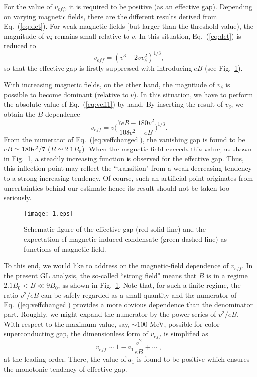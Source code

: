 \documentclass[12pt]{article}
\begin{document}
For the value of $v_{eff}$, it is required to be positive (as an effective gap).
Depending on varying magnetic fields, there are the different results derived from Eq.~(\ref{eq:det}).
For weak magnetic fields (but larger than the threshold value), the magnitude of $v_\delta$ remains
small relative to $v$. In this situation, Eq.~(\ref{eq:det}) is reduced to
\begin{equation}
\label{eq:veff1}
v_{eff} =  (v^3-2 vv_\delta^2)^{1/3},
\end{equation}
so that the effective gap is firstly suppressed with introducing $eB$ (see Fig.~\ref{fig:1}).

With increasing magnetic fields, on the other hand, the magnitude of $v_\delta$ is possible to
become dominant (relative to $v$). In this situation, we have to perform the absolute value of
Eq.~(\ref{eq:veff1}) by hand. By inserting the result of $v_\delta$, we obtain the $B$ dependence
\begin{equation}
\label{eq:veffchanged}
v_{eff} = v \Big(\frac{7eB-180v^2}{108v^2-eB}\Big)^{1/3}.
\end{equation}
From the numerator of Eq.~(\ref{eq:veffchanged}), the vanishing gap is found to be $eB\simeq 180v^2/7$
($B \simeq 2.1 B_0$).
When the magnetic field exceeds this value, as shown in Fig.~\ref{fig:1}, a steadily increasing function
is observed for the effective gap. Thus, this inflection point may reflect the ``transition" from a weak
decreasing tendency to a strong increasing tendency. Of course, such an artificial point originates from
uncertainties behind our estimate hence its result should not be taken too seriously.

\begin{figure}
\texttt{[image: 1.eps]}
\caption{Schematic figure of the effective gap (red solid line) and the expectation of magnetic-induced
condensate (green dashed line) as functions of magnetic field.}
	\label{fig:1}
\end{figure}

To this end, we would like to address on the magnetic-field dependence of $v_{eff}$. In the
present GL analysis, the so-called ``strong field" means that $B$ is in a regime
$2.1 B_0 < B \ll 9 B_0$, as shown in Fig.~\ref{fig:1}. Note that, for such a finite regime,
the ratio $v^2/eB$ can be safely regarded as a small quantity and the numerator of
Eq.~(\ref{eq:veffchanged}) provides a more obvious dependence than the denominator part.
Roughly, we might expand the numerator by the power series of $v^2/eB$. With respect to the
maximum value, say, $\sim 100$ MeV, possible for color-superconducting gap, the dimensionless
form of $v_{eff}$ is simplified as
\begin{equation}\label{eq:expansion1}
 v_{eff} \sim 1 - a_1 \frac{v^2}{eB} + \cdots \ ,
\end{equation}
at the leading order. There, the value of $a_1$ is found to be positive which ensures the
monotonic tendency of effective gap.
\end{document}
